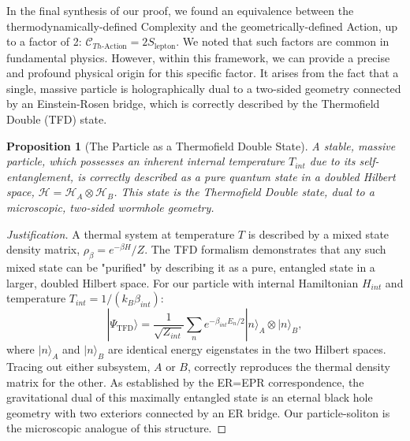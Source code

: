 \documentclass[11pt, letterpaper]{report}
\theoremstyle{plain} %
\newtheorem{proposition}[theorem]{Proposition}
\theoremstyle{definition} %
\theoremstyle{remark} %
\begin{document}
In the final synthesis of our proof, we found an equivalence between the thermodynamically-defined Complexity and the geometrically-defined Action, up to a factor of 2: $\mathcal{C}_{Th\text{-Action}} = 2 S_{\text{lepton}}$. We noted that such factors are common in fundamental physics. However, within this framework, we can provide a precise and profound physical origin for this specific factor. It arises from the fact that a single, massive particle is holographically dual to a two-sided geometry connected by an Einstein-Rosen bridge, which is correctly described by the Thermofield Double (TFD) state.

\begin{proposition}[The Particle as a Thermofield Double State]
A stable, massive particle, which possesses an inherent internal temperature $T_{int}$ due to its self-entanglement, is correctly described as a pure quantum state in a doubled Hilbert space, $\mathcal{H} = \mathcal{H}_A \otimes \mathcal{H}_B$. This state is the Thermofield Double state, dual to a microscopic, two-sided wormhole geometry.
\end{proposition}
\begin{proof}[Justification]
A thermal system at temperature $T$ is described by a mixed state density matrix, $\rho_\beta = e^{-\beta H}/Z$. The TFD formalism demonstrates that any such mixed state can be "purified" by describing it as a pure, entangled state in a larger, doubled Hilbert space. For our particle with internal Hamiltonian $H_{int}$ and temperature $T_{int} = 1/(k_B\beta_{int})$:
\begin{equation}
    |\Psi_{\text{TFD}}\rangle = \frac{1}{\sqrt{Z_{int}}} \sum_n e^{-\beta_{int} E_n/2} |n\rangle_A \otimes |n\rangle_B,
\end{equation}
where $|n\rangle_A$ and $|n\rangle_B$ are identical energy eigenstates in the two Hilbert spaces. Tracing out either subsystem, $A$ or $B$, correctly reproduces the thermal density matrix for the other. As established by the ER=EPR correspondence, the gravitational dual of this maximally entangled state is an eternal black hole geometry with two exteriors connected by an ER bridge. Our particle-soliton is the microscopic analogue of this structure.
\end{proof}
\end{document}
